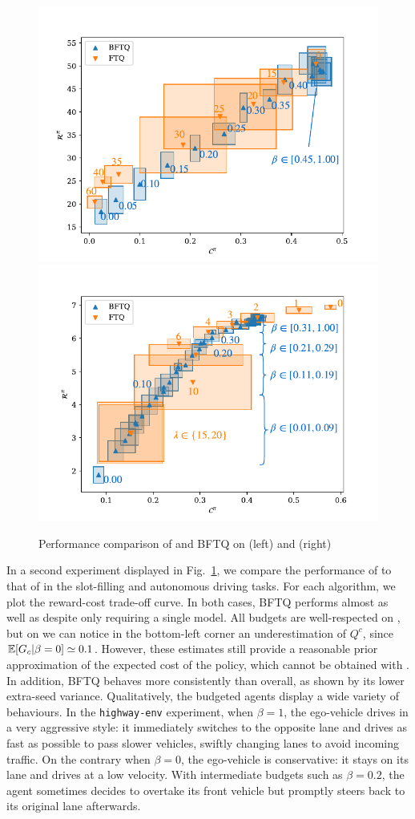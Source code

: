 \documentclass{article}
\begin{document}
\begin{figure}[tp]
    \begin{center}
    \includegraphics[width=0.45\linewidth]{source/img/slot-filling}
    \includegraphics[width=0.45\linewidth]{source/img/highway}
    \caption{Performance comparison of \FTQl and BFTQ on  (left) and (right) }
    \label{fig:results}
    \end{center}
\end{figure}

In a second experiment displayed in Fig.~\ref{fig:results}, we compare the performance of \FTQl to that of \BFTQ in the slot-filling and autonomous driving tasks. For each algorithm, we plot the reward-cost trade-off curve. In both cases, BFTQ performs almost as well as \FTQl despite only requiring a single model. All budgets are well-respected on , but on  we can notice in the bottom-left corner an underestimation of $Q^c$, since $\operatorname*{\mathbb{E}}[G_c|\beta=0] \simeq 0.1 $. However, these estimates still provide a reasonable prior approximation of the expected cost of the policy, which cannot be obtained with \FTQl. In addition, BFTQ behaves more consistently than \FTQl overall, as shown by its lower extra-seed variance. Qualitatively, the budgeted agents display a wide variety of behaviours. In the \texttt{highway-env} experiment, when $\beta = 1$, the ego-vehicle drives in a very aggressive style: it immediately switches to the opposite lane and drives as fast as possible to pass slower vehicles, swiftly changing lanes to avoid incoming traffic. On the contrary when $\beta = 0$, the ego-vehicle is conservative: it stays on its lane and drives at a low velocity. With intermediate budgets such as $\beta = 0.2$, the agent sometimes decides to overtake its front vehicle but promptly steers back to its original lane afterwards.
\end{document}
